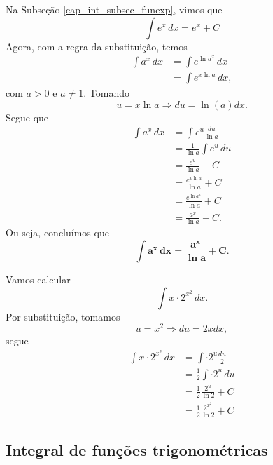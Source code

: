 Na Subseção \ref{cap_int_subsec_funexp}, vimos que
\begin{equation}
  \int e^x\,dx = e^x + C
\end{equation}
Agora, com a regra da substituição, temos
\begin{align}
  \int a^x\,dx &= \int e^{\ln a^x}\,dx \\
               &= \int e^{x\ln a}\,dx,
\end{align}
com $a>0$ e $a\neq 1$. Tomando
\begin{equation}
  u = x\ln a \Rightarrow du = \ln(a)dx.
\end{equation}
Segue que
\begin{align}
  \int a^x\,dx &= \int e^u\frac{du}{\ln a} \\
               &= \frac{1}{\ln a}\int e^u\,du \\
               &= \frac{e^u}{\ln a} + C \\
               &= \frac{e^{x\ln a}}{\ln a} + C \\
               &= \frac{e^{\ln a^x}}{\ln a} + C \\
               &= \frac{a^x}{\ln a} + C.
\end{align}
Ou seja, concluímos que
\begin{equation}
  \pmb{\int a^x\,dx = \frac{a^x}{\ln a} + C}.
\end{equation}

\begin{ex}
  Vamos calcular
  \begin{equation}
    \int x\cdot 2^{x^2}\,dx.
  \end{equation}
  Por substituição, tomamos
  \begin{equation}
    u = x^2 \Rightarrow du = 2xdx,
  \end{equation}
  segue
  \begin{align}
    \int x\cdot 2^{x^2}\,dx &= \int \cdot 2^{u}\frac{du}{2} \\
                            &= \frac{1}{2}\int \cdot 2^{u}\,du \\
                            &= \frac{1}{2}\frac{2^u}{\ln 2} + C \\
                            &= \frac{1}{2}\frac{2^{x^2}}{\ln 2} + C
  \end{align}
\end{ex}

\subsection{Integral de funções trigonométricas}

